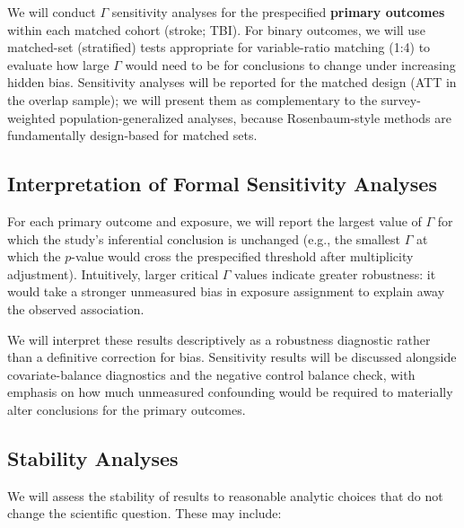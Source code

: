 \documentclass{article}
\begin{document}
We will conduct $\Gamma$ sensitivity analyses for the prespecified \textbf{primary outcomes} within each matched cohort (stroke; TBI). For binary outcomes, we will use matched-set (stratified) tests appropriate for variable-ratio matching (1:4) to evaluate how large $\Gamma$ would need to be for conclusions to change under increasing hidden bias. Sensitivity analyses will be reported for the matched design (ATT in the overlap sample); we will present them as complementary to the survey-weighted population-generalized analyses, because Rosenbaum-style methods are fundamentally design-based for matched sets.

\subsection{Interpretation of Formal Sensitivity Analyses}

For each primary outcome and exposure, we will report the largest value of $\Gamma$ for which the study's inferential conclusion is unchanged (e.g., the smallest $\Gamma$ at which the $p$-value would cross the prespecified threshold after multiplicity adjustment). Intuitively, larger critical $\Gamma$ values indicate greater robustness: it would take a stronger unmeasured bias in exposure assignment to explain away the observed association.

We will interpret these results descriptively as a robustness diagnostic rather than a definitive correction for bias. Sensitivity results will be discussed alongside covariate-balance diagnostics and the negative control balance check, with emphasis on how much unmeasured confounding would be required to materially alter conclusions for the primary outcomes.

\subsection{Stability Analyses}

We will assess the stability of results to reasonable analytic choices that do not change the scientific question. These may include:
\end{document}
